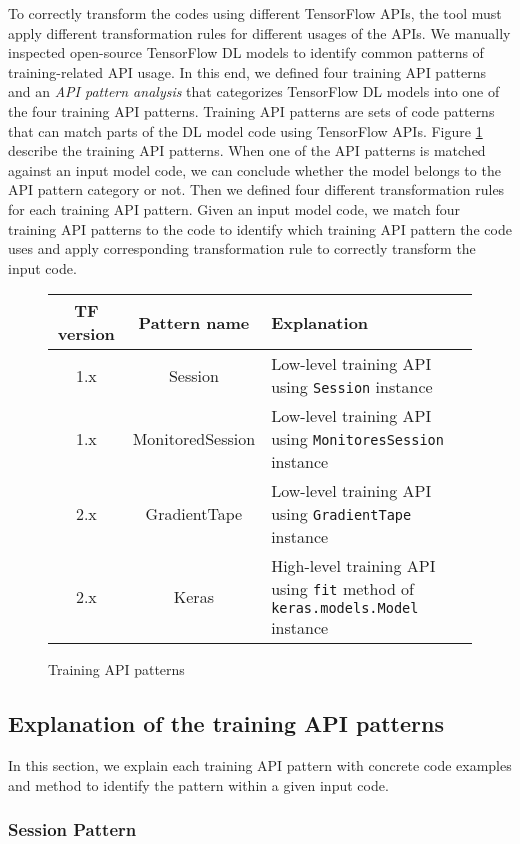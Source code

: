 To correctly transform the codes using different TensorFlow APIs, 
the tool must apply different transformation rules for different usages
of the APIs.
We manually inspected open-source TensorFlow DL models to identify
common patterns of training-related API usage.
In this end, we defined four training API patterns and 
an \textit{API pattern analysis} that categorizes TensorFlow DL models
into one of the four training API patterns.
Training API patterns are sets of code patterns that can match
parts of the DL model code using TensorFlow APIs.
Figure \ref{tab:patterns} describe the training API patterns.
When one of the API patterns is matched against an input model code,
we can conclude whether the model belongs to the API pattern category or not. 
Then we defined four different transformation rules for each training API
pattern.
Given an input model code, we match four training API patterns to the code
to identify  which training API pattern the code uses and apply corresponding
transformation rule to correctly transform the input code.

\begin{figure}
  \centering
  \begin{tabular}{|c|c|l|}
    \hline
    TF version & Pattern name & Explanation \\
    \hline
    1.x & Session & Low-level training API using {\tt Session} instance\\
    \hline
    1.x & MonitoredSession & Low-level training API using {\tt MonitoresSession} instance \\
    \hline
    2.x & GradientTape & Low-level training API using {\tt GradientTape} instance\\
    \hline
    2.x & Keras & High-level training API using {\tt fit} method of {\tt keras.models.Model} instance\\
    \hline
  \end{tabular}
  \caption{Training API patterns}
  \label{tab:patterns}
\end{figure}

\subsection{Explanation of the training API patterns}

In this section, we explain each training API pattern with
concrete code examples and method to identify the pattern
within a given input code.

\subsubsection{Session Pattern}

